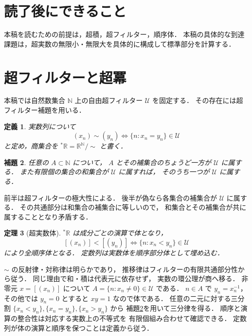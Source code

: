 \documentclass[a5paper,10pt,onecolumn]{jsarticle}
\makeatletter
\theoremstyle{mathnotetheorem}
\newtheorem{theorem}{定理}[section]
\newtheorem{definition}[theorem]{定義}
\newtheorem{lemma}[theorem]{補題}
\renewcommand{\proofname}{証明}
\renewenvironment{proof}[1][\proofname]{%
  \par\pushQED{\qed}\normalfont\topsep4\p@\@plus2\p@\relax
  \trivlist\item[\hskip\labelsep\bfseries #1]\ignorespaces
}{\popQED\endtrivlist\@endpefalse}
\makeatother
\begin{document}
\section*{読了後にできること}
本稿を読むための前提は，超積，超フィルター，順序体．
本稿の具体的な到達課題は，超実数の無限小・無限大を具体的に構成して標準部分を計算する．

\section{超フィルターと超冪}
本稿では自然数集合 $\mathbb N$ 上の自由超フィルター $\mathcal U$ を固定する．
その存在には超フィルター補題を用いる．
\begin{definition}
実数列について
\[
 (x_n)\sim(y_n)\iff\{n:x_n=y_n\}\in\mathcal U
\]
と定め，商集合を
$ {}^*\mathbb R=\mathbb R^{\mathbb N}/{\sim}$ と書く．
\end{definition}
\begin{lemma}\label{lem:ultra}
任意の $A\subset\mathbb N$ について，
$A$ とその補集合のちょうど一方が $\mathcal U$ に属する．
また有限個の集合の和集合が $\mathcal U$ に属すれば，
そのうち一つが $\mathcal U$ に属する．
\end{lemma}
\begin{proof}
前半は超フィルターの極大性による．
後半が偽なら各集合の補集合が $\mathcal U$ に属する．
その共通部分は和集合の補集合に等しいので，
和集合とその補集合が共に属することとなり矛盾する．
\end{proof}
\begin{theorem}[超実数体]\label{thm:field}
$ {}^*\mathbb R$ は成分ごとの演算で体となり，
\[
 [(x_n)]<[(y_n)]\iff\{n:x_n<y_n\}\in\mathcal U
\]
により全順序体となる．
定数列は実数体を順序部分体として埋め込む．
\end{theorem}
\begin{proof}
$\sim$ の反射律・対称律は明らかであり，
推移律はフィルターの有限共通部分性から従う．
同じ理由で和・積は代表元に依存せず，
実数の環公理が商へ移る．
非零元 $x=[(x_n)]$ について
$A=\{n:x_n\ne0\}\in\mathcal U$ である．
$n\in A$ で $y_n=x_n^{-1}$，その他では $y_n=0$ とすると
$xy=1$ なので体である．
任意の二元に対する三分割
$\{x_n<y_n\},\{x_n=y_n\},\{x_n>y_n\}$ から
補題\ref{lem:ultra}を用いて三分律を得る．
順序と演算の整合性は対応する実数上の不等式を
有限個組み合わせて確認できる．
定数列が体の演算と順序を保つことは定義から従う．
\end{proof}
\end{document}
